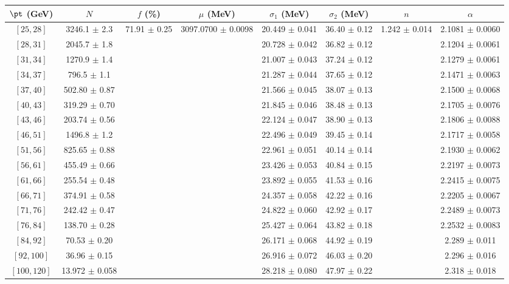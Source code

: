 \begin{tabular}{c||c|c|c|c|c|c|c}
$\pt$ (GeV) & $N$ & $f$ (\%) & $\mu$ (MeV) & $\sigma_1$ (MeV) & $\sigma_2$ (MeV) & $n$ & $\alpha$ \\
\hline
$[25, 28]$ & 3246.1 $\pm$ 2.3 & \multirow{17}{*}{71.91 $\pm$ 0.25} & \multirow{17}{*}{3097.0700 $\pm$ 0.0098} & 20.449 $\pm$ 0.041 & 36.40 $\pm$ 0.12 & \multirow{17}{*}{1.242 $\pm$ 0.014} & 2.1081 $\pm$ 0.0060\\
$[28, 31]$ & 2045.7 $\pm$ 1.8 &  &  & 20.728 $\pm$ 0.042 & 36.82 $\pm$ 0.12 &  & 2.1204 $\pm$ 0.0061\\
$[31, 34]$ & 1270.9 $\pm$ 1.4 &  &  & 21.007 $\pm$ 0.043 & 37.24 $\pm$ 0.12 &  & 2.1279 $\pm$ 0.0061\\
$[34, 37]$ & 796.5 $\pm$ 1.1 &  &  & 21.287 $\pm$ 0.044 & 37.65 $\pm$ 0.12 &  & 2.1471 $\pm$ 0.0063\\
$[37, 40]$ & 502.80 $\pm$ 0.87 &  &  & 21.566 $\pm$ 0.045 & 38.07 $\pm$ 0.13 &  & 2.1500 $\pm$ 0.0068\\
$[40, 43]$ & 319.29 $\pm$ 0.70 &  &  & 21.845 $\pm$ 0.046 & 38.48 $\pm$ 0.13 &  & 2.1705 $\pm$ 0.0076\\
$[43, 46]$ & 203.74 $\pm$ 0.56 &  &  & 22.124 $\pm$ 0.047 & 38.90 $\pm$ 0.13 &  & 2.1806 $\pm$ 0.0088\\
$[46, 51]$ & 1496.8 $\pm$ 1.2 &  &  & 22.496 $\pm$ 0.049 & 39.45 $\pm$ 0.14 &  & 2.1717 $\pm$ 0.0058\\
$[51, 56]$ & 825.65 $\pm$ 0.88 &  &  & 22.961 $\pm$ 0.051 & 40.14 $\pm$ 0.14 &  & 2.1930 $\pm$ 0.0062\\
$[56, 61]$ & 455.49 $\pm$ 0.66 &  &  & 23.426 $\pm$ 0.053 & 40.84 $\pm$ 0.15 &  & 2.2197 $\pm$ 0.0073\\
$[61, 66]$ & 255.54 $\pm$ 0.48 &  &  & 23.892 $\pm$ 0.055 & 41.53 $\pm$ 0.16 &  & 2.2415 $\pm$ 0.0075\\
$[66, 71]$ & 374.91 $\pm$ 0.58 &  &  & 24.357 $\pm$ 0.058 & 42.22 $\pm$ 0.16 &  & 2.2205 $\pm$ 0.0067\\
$[71, 76]$ & 242.42 $\pm$ 0.47 &  &  & 24.822 $\pm$ 0.060 & 42.92 $\pm$ 0.17 &  & 2.2489 $\pm$ 0.0073\\
$[76, 84]$ & 138.70 $\pm$ 0.28 &  &  & 25.427 $\pm$ 0.064 & 43.82 $\pm$ 0.18 &  & 2.2532 $\pm$ 0.0083\\
$[84, 92]$ & 70.53 $\pm$ 0.20 &  &  & 26.171 $\pm$ 0.068 & 44.92 $\pm$ 0.19 &  & 2.289 $\pm$ 0.011\\
$[92, 100]$ & 36.96 $\pm$ 0.15 &  &  & 26.916 $\pm$ 0.072 & 46.03 $\pm$ 0.20 &  & 2.296 $\pm$ 0.016\\
$[100, 120]$ & 13.972 $\pm$ 0.058 &  &  & 28.218 $\pm$ 0.080 & 47.97 $\pm$ 0.22 &  & 2.318 $\pm$ 0.018\\
\end{tabular}
